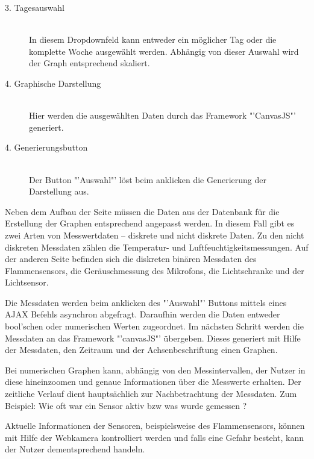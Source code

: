 \begin{description}
	\item[3. Tagesauswahl] \hfill \\
		In diesem Dropdownfeld kann entweder ein möglicher Tag oder die komplette Woche ausgewählt werden. Abhängig von dieser Auswahl wird der Graph entsprechend skaliert. 
	\item[4. Graphische Darstellung] \hfill \\
		Hier werden die ausgewählten Daten durch das Framework "'CanvasJS"' generiert. 
	\item[4. Generierungsbutton] \hfill \\
		Der Button "'Auswahl"' löst beim anklicken die Generierung der Darstellung aus.
	\end{description}
Neben dem Aufbau der Seite müssen die Daten aus der Datenbank für die Erstellung der Graphen entsprechend angepasst werden. In diesem Fall gibt es zwei Arten von Messwertdaten  – diskrete und nicht diskrete Daten. Zu den nicht diskreten Messdaten zählen die Temperatur- und Luftfeuchtigkeitsmessungen. Auf der anderen Seite befinden sich die diskreten binären Messdaten des Flammensensors, die Geräuschmessung des Mikrofons, die Lichtschranke und der Lichtsensor.

Die Messdaten werden beim anklicken des "'Auswahl"' Buttons mittels eines \ac{AJAX} Befehls asynchron abgefragt. Daraufhin werden die Daten entweder bool'schen oder numerischen Werten zugeordnet. Im nächsten Schritt werden die Messdaten an das Framework "'canvasJS"' übergeben. Dieses generiert mit Hilfe der Messdaten, den Zeitraum und der Achsenbeschriftung einen Graphen.

Bei numerischen Graphen kann, abhängig von den Messintervallen, der Nutzer in diese hineinzoomen und genaue Informationen über die Messwerte erhalten. Der zeitliche Verlauf dient hauptsächlich zur Nachbetrachtung der Messdaten. Zum Beispiel: Wie oft war ein Sensor aktiv bzw was wurde gemessen ?

Aktuelle Informationen der Sensoren, beispielsweise des Flammensensors, können mit Hilfe der Webkamera kontrolliert werden und falls eine Gefahr besteht, kann der Nutzer dementsprechend handeln.
